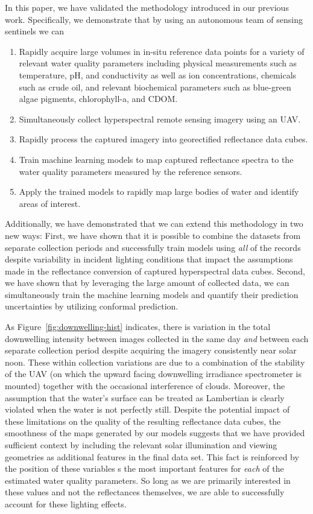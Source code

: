 \documentclass[sensors,article,submit,pdftex,moreauthors]{Definitions/mdpi}
\begin{document}
In this paper, we have validated the methodology introduced in our previous work\cite{robotTeam1}. Specifically, we demonstrate that by using an autonomous team of sensing sentinels we can
\begin{enumerate}
    \item Rapidly acquire large volumes in in-situ reference data points for a variety of relevant water quality parameters including physical measurements such as temperature, pH, and conductivity as well as ion concentrations, chemicals such as crude oil, and relevant biochemical parameters such as blue-green algae pigments, chlorophyll-a, and CDOM. 
    \item Simultaneously collect hyperspectral remote sensing imagery using an UAV.
    \item Rapidly process the captured imagery into georectified reflectance data cubes.
    \item Train machine learning models to map captured reflectance spectra to the water quality parameters measured by the reference sensors.
    \item Apply the trained models to rapidly map large bodies of water and identify areas of interest.
\end{enumerate}
Additionally, we have demonstrated that we can extend this methodology in two new ways: First, we have shown that it is possible to combine the datasets from separate collection periods and successfully train models using \textit{all} of the records despite variability in incident lighting conditions that impact the assumptions made in the reflectance conversion of captured hyperspectral data cubes. Second, we have shown that by leveraging the large amount of collected data, we can simultaneously train the machine learning models and quantify their prediction uncertainties by utilizing conformal prediction. 

As Figure~\ref{fig:downwelling-hist} indicates, there is variation in the total downwelling intensity between images collected in the same day \textit{and} between each separate collection period despite acquiring the imagery consistently near solar noon. These within collection variations are due to a combination of the stability of the UAV (on which the upward facing downwelling irradiance spectrometer is mounted) together with the occasional interference of clouds. Moreover, the assumption that the water's surface can be treated as Lambertian is clearly violated when the water is not perfectly still. Despite the potential impact of these limitations on the quality of the resulting reflectance data cubes, the smoothness of the maps generated by our models suggests that we have provided sufficient context by including the relevant solar illumination and viewing geometries as additional features in the final data set.  This fact is reinforced by the position of these variables s the most important features for \textit{each} of the estimated water quality parameters. So long as we are primarily interested in these values and not the reflectances themselves, we are able to successfully account for these lighting effects.
\end{document}
